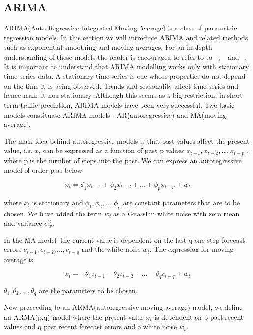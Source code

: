 \subsection{ARIMA}
ARIMA(Auto Regressive Integrated Moving Average) is a class of parametric regression models. In
this section we will introduce ARIMA and related methods such as exponential smoothing and moving
averages. For an in depth understanding of these models the reader is encouraged to refer to to
~\citet{tong1990non}, ~\citet{brockwell2006introduction} and ~\citet{box2015time}. It is
important to understand that ARIMA modelling works only with stationary time series data. A
stationary time series is one whose properties do not depend on the time it is being observed.
Trends and seasonality affect time series and hence make it non-stationary. Although this seems as a
big restriction, in short term traffic prediction, ARIMA models have been very successful. Two
basic models constituate ARIMA models - AR(autoregressive) and MA(moving average).

The main idea behind autoregressive models is that past values affect the present value, i.e.
$x_{t}$ can be expressed as a function of past p values $ x_{t-1}, x_{t-2},...,x_{t-p} $ , where
p is the number of steps into the past. We can express an autoregressive model of order p as below

        \begin{equation} \label{eq:autoregressive}
          x_{t} = \phi_{1}x_{t-1} + \phi_{2}x_{t-2} + ... + \phi_{p}x_{t-p} + w_{t}
        \end{equation}

where $x_{t}$ is stationary and $\phi_{1}, \phi_{2},..., \phi_{p}$ are constant
parameters that are to be chosen. We have added the term $w_{t}$ as a Guassian white noise with
zero mean and variance $\sigma^{2}_{w}$.

In the MA model, the current value is dependent on the last q one-step forecast errors
$e_{t-1}, e_{t-2},...,e_{t-q}$ and the white noise $w_{t}$. The expression for moving average
is

        \begin{equation} \label{eq:movingaverage}
          x_{t} = -\theta_{1}e_{t-1} - \theta_{2}e_{t-2} - ... - \theta_{q}e_{t-q} + w_{t}
        \end{equation}

$\theta_{1}, \theta_{2},..., \theta_{q}$ are the parameters to be chosen.

Now proceeding to an ARMA(autoregressive moving average) model, we define an ARMA(p,q) model
where the present value $x_{t}$ is dependent on p past recent values and q past recent forecast
errors and a white noise $w_{t}$.

